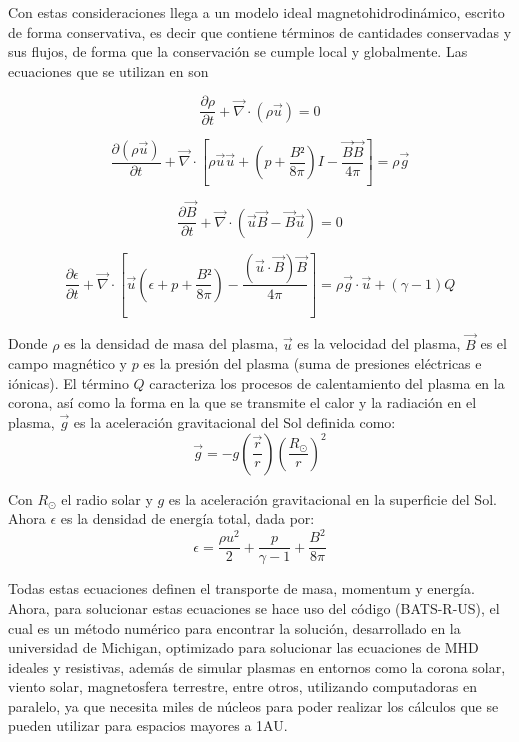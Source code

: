 Con estas consideraciones \cite{lugaz-2005} llega a un modelo ideal magnetohidrodinámico, escrito de forma conservativa, es decir que contiene términos de cantidades conservadas y sus flujos, de forma que la conservación se cumple local y globalmente. Las ecuaciones que se utilizan en son 

\begin{equation}
  \frac{\partial\rho}{\partial t} + \vec{\nabla} \cdot (\rho \vec{u})=0  
\end{equation}

\begin{equation}
    \frac{\partial (\rho \vec{u})}{\partial t}+\vec{\nabla} \cdot \left[\rho \vec{u}\vec{u}+(p+\frac{B²}{8 \pi})I-\frac{\vec{B}\vec{B}}{4\pi}\right]=\rho \vec{g}
\end{equation}

\begin{equation}
    \frac{\partial \vec{B}}{\partial t}+\vec{\nabla} \cdot (\vec{u}\vec{B}-\vec{B}\vec{u})=0
\end{equation}

\begin{equation}
    \frac{\partial \epsilon}{\partial t}+\vec{\nabla} \cdot \left[ \vec{u}(\epsilon+p+\frac{B²}{8\pi})-\frac{(\vec{u}\cdot \vec{B})\vec{B}}{4\pi}\right]=\rho \vec{g}\cdot \vec{u}+(\gamma - 1)Q
\end{equation}

Donde $\rho$ es la densidad de masa del plasma, $\vec{u}$ es la velocidad del plasma, $\vec{B}$ es el campo magnético y $p$ es la presión del plasma (suma de presiones eléctricas e iónicas). El término $Q$ caracteriza los procesos de calentamiento del plasma en la corona, así como la forma en la que se transmite el calor y la radiación en el plasma, $\vec{g}$ es la aceleración gravitacional del Sol definida como:
\begin{equation}
  \vec{g}=-g\left( \frac{\vec{r}}{r} \right)\left( \frac{R_{\odot}}{r} \right)^{2}  
\end{equation}

Con $R_{\odot}$ el radio solar y $g$ es la aceleración gravitacional en la superficie del Sol. Ahora $\epsilon$ es la densidad de energía total, dada por:
\begin{equation}
    \epsilon=\frac{\rho u^{2}}{2}+\frac{p}{\gamma-1}+\frac{B^{2}}{8\pi}
\end{equation}

Todas estas ecuaciones definen el transporte de masa, momentum y energía. Ahora, para solucionar estas ecuaciones se hace uso del código (BATS-R-US), el cual es un método numérico para encontrar la solución, desarrollado en la universidad de Michigan, optimizado para solucionar las ecuaciones de MHD ideales y resistivas, además de simular plasmas en entornos como la corona solar, viento solar, magnetosfera terrestre, entre otros, utilizando computadoras en paralelo, ya que necesita miles de núcleos para poder realizar los cálculos que se pueden utilizar para espacios mayores a 1AU.

